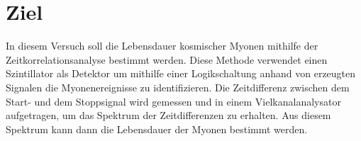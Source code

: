 \section{Ziel}
\label{sec:Ziel}

In diesem Versuch soll die Lebensdauer kosmischer Myonen mithilfe der Zeitkorrelationsanalyse bestimmt werden.
Diese Methode verwendet einen Szintillator als Detektor 
um mithilfe einer Logikschaltung anhand von erzeugten Signalen die Myonenereignisse zu identifizieren.
Die Zeitdifferenz zwischen dem Start- und dem Stoppsignal wird gemessen und in einem Vielkanalanalysator aufgetragen, 
um das Spektrum der Zeitdifferenzen zu erhalten. 
Aus diesem Spektrum kann dann die Lebensdauer der Myonen bestimmt werden.
